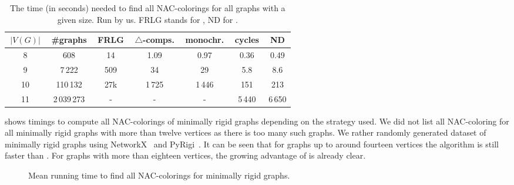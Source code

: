 \begin{table}[ht]
	\caption[Running times on graphs.]{
		The time (in seconds) needed to find all NAC-colorings for all graphs with a given size. Run by us.
		\textsc{FRLG} stands for \flexrilog{}, \textsc{ND} for \NeighborsDegree{}.}%
	\label{tab:all_min_rigid}
	\vspace{0.3cm}
	\centering
	\begin{tabular}{ccccccc}
		\hline
		\,$|V(G)|$\, & \,\#graphs\, & \,FRLG\, & \,$\triangle$-comps.\, & \,monochr.\, & \,cycles\, & \,\textsc{ND}\, \\
		\hline
		8            & 608          & 14       & 1.09                   & 0.97         & 0.36       & 0.49            \\
		9            & 7\,222       & 509      & 34                     & 29           & 5.8        & 8.6             \\
		10           & 110\,132     & 27k      & 1\,725                 & 1\,446       & 151        & 213             \\
		11           & 2\,039\,273  & -        & -                      & -            & 5\,440     & 6\,650          \\
		\hline
	\end{tabular}
\end{table}

shows timings to compute all NAC-colorings of minimally rigid graphs
depending on the strategy used.
We did not list all NAC-coloring for all minimally rigid graphs with more than twelve vertices
as there is too many such graphs.
%
We rather randomly generated dataset of minimally rigid graphs
using NetworkX~\cite{networkx} and PyRigi~\cite{pyrigi}.
%
It can be seen that for graphs up to around fourteen vertices the \NaiveCycles{} algorithm
is still faster than \Subgraphs{}.
For graphs with more than eighteen vertices,
the growing advantage of \Subgraphs{} is already clear.

\begin{figure}[ht]
	\centering
	\scalebox{0.5}{}
	\caption[Running time for minimally rigid graphs.]{
		Mean running time to find all NAC-colorings for minimally rigid graphs.}%
	\label{fig:graph_time_minimally_rigid}
\end{figure}%

